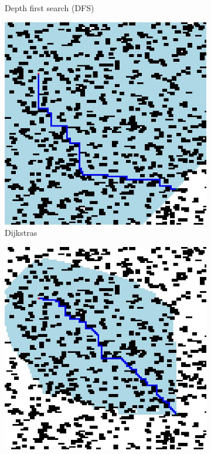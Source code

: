 \documentclass{article}
\begin{document}
\begin{figure}[H]
\begin{subfigure}{0.45\textwidth}
        \caption{Depth first search (DFS)}
    \end{subfigure}
    \begin{subfigure}{0.45\textwidth}
        \centering
        \includegraphics[width = \textwidth]{images/dijkstras.jpg}
        \caption{Dijkstras}
    \end{subfigure}
    \begin{subfigure}{0.45\textwidth}
        \centering
        \includegraphics[width = \textwidth]{images/astar.jpg}

\end{subfigure}
\end{figure}
\end{document}
